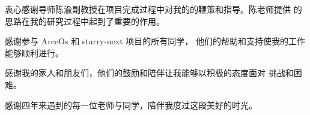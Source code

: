 
\begin{acknowledgements}
  衷心感谢导师陈渝副教授在项目完成过程中对我的的鞭策和指导。陈老师提供
的思路在我的研究过程中起到了重要的作用。

感谢参与 ArceOs 和 starry-next 项目的所有同学，
他们的帮助和支持使我的工作能够顺利进行。

感谢我的家人和朋友们，他们的鼓励和陪伴让我能够以积极的态度面对
挑战和困难。

感谢四年来遇到的每一位老师与同学，陪伴我度过这段美好的时光。
\end{acknowledgements}